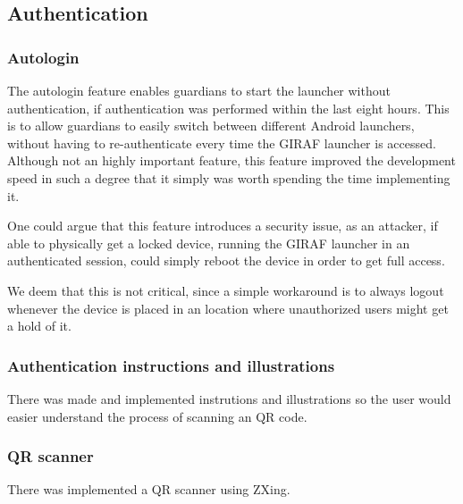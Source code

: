 \subsection{Authentication}
\label{backlog:authentication}

\subsubsection{Autologin}
\label{backlog:autologin}

The autologin feature enables guardians to start the launcher without authentication, if authentication was performed within the last eight hours. This is to allow guardians to easily switch between different Android launchers, without having to re-authenticate every time the GIRAF launcher is accessed. Although not an highly important feature, this feature improved the development speed in such a degree that it simply was worth spending the time implementing it.

One could argue that this feature introduces a security issue, as an attacker, if able to physically get a locked device, running the GIRAF launcher in an authenticated session, could simply reboot the device in order to get full access.

We deem that this is not critical, since a simple workaround is to always logout whenever the device is placed in an location where unauthorized users might get a hold of it.

\subsubsection{Authentication instructions and illustrations}
\label{backlog:authentication_illustrations}

There was made and implemented instrutions and illustrations so the user would easier understand the process of scanning an QR code.

\subsubsection{QR scanner}
\label{backlog:QR_scanner}

There was implemented a QR scanner using ZXing.